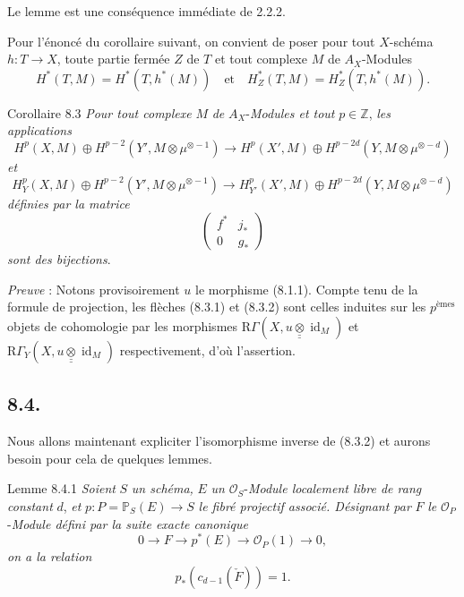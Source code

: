 Le lemme est une conséquence immédiate de 2.2.2.

Pour l'énoncé du corollaire suivant, on convient de poser pour tout $X$-schéma $h:T\to X$, toute partie fermée $Z$ de $T$ et tout complexe $M$ de $A_X$-Modules
\[
H^*(T,M)=H^*(T,h^*(M))
\quad\text{et}\quad
H^*_Z(T,M)=H^*_Z(T,h^*(M)).
\]

\begin{statement}{Corollaire 8.3}
\emph{Pour tout complexe} $M$ \emph{de} $A_X$-\emph{Modules et tout} $p\in\mathbb{Z}$, \emph{les applications}
\[
H^p(X,M)\oplus H^{p-2}(Y',M\otimes\mu^{\otimes -1})
\to
H^p(X',M)\oplus H^{p-2d}(Y,M\otimes\mu^{\otimes -d})
\tag{8.3.1.}
\]
\emph{et}
\[
H_Y^p(X,M)\oplus H^{p-2}(Y',M\otimes\mu^{\otimes -1})
\to
H_{Y'}^p(X',M)\oplus H^{p-2d}(Y,M\otimes\mu^{\otimes -d})
\tag{8.3.2}
\]
\emph{définies par la matrice}
\[
\begin{pmatrix}
f^*&j_*\\
0&g_*
\end{pmatrix}
\]
\emph{sont des bijections}.
\end{statement}

\emph{Preuve} : Notons provisoirement $u$ le morphisme (8.1.1). Compte tenu de la formule de projection, les flèches (8.3.1) et (8.3.2) sont celles induites sur les $p^{\text{èmes}}$ objets de cohomologie par les morphismes $\mathrm{R}\Gamma(X,u\mathbin{\underline{\underline{\otimes}}}\operatorname{id}_M)$ et $\mathrm{R}\Gamma_Y(X,u\mathbin{\underline{\underline{\otimes}}}\operatorname{id}_M)$ respectivement, d'où l'assertion.

\subsection*{8.4.}

Nous allons maintenant expliciter l'isomorphisme inverse de (8.3.2) et aurons besoin pour cela de quelques lemmes.

\begin{statement}{Lemme 8.4.1}
\emph{Soient} $S$ \emph{un schéma,} $E$ \emph{un} $\mathcal{O}_S$-\emph{Module localement libre de rang constant} $d$, \emph{et} $p:P=\mathbb{P}_S(E)\to S$ \emph{le fibré projectif associé. Désignant par} $F$ \emph{le} $\mathcal{O}_P$-\emph{Module défini par la suite exacte canonique}
\[
0\to F\to p^*(E)\to\mathcal{O}_P(1)\to0,
\]
\emph{on a la relation}
\[
p_*(c_{d-1}(\check F))=1.
\]
\end{statement}


